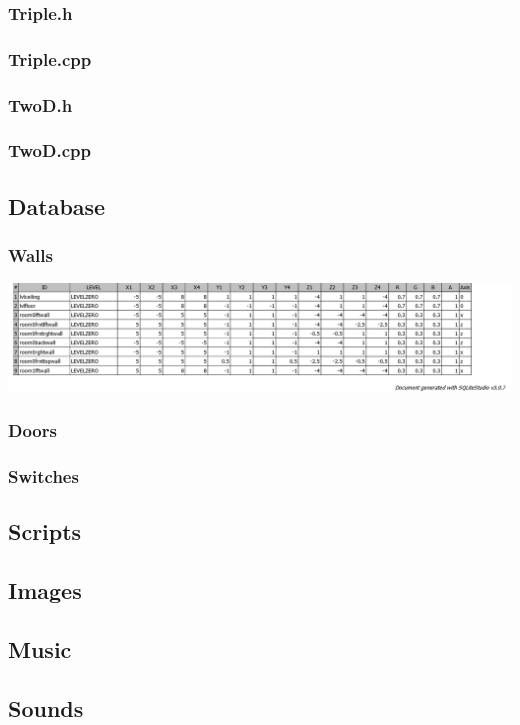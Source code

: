 \documentclass{article}
\begin{document}
\subsubsection{Triple.h}
	
	 				
\subsubsection{Triple.cpp}
	
	 				
\subsubsection{TwoD.h}
	

\subsubsection{TwoD.cpp}	
	

\subsection{Database}

\subsubsection{Walls}
	\includegraphics[width=18cm]{WALLS}

\subsubsection{Doors}

\subsubsection{Switches}
	 	 				
\subsection{Scripts}
 
\subsection{Images}
 
\subsection{Music}
	 	 	 				
\subsection{Sounds}
	 	 	 				
\end{document}
